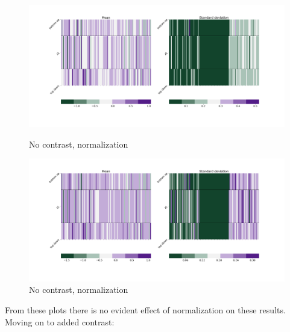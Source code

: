 \documentclass[12pt, english]{article}
\begin{document}
\begin{figure}[H]
  \begin{minipage}{0.5\linewidth}
    \centering
    \includegraphics[width=.75\linewidth]{z1_vis/z1_vis_no_contrast_norm/17_DenseLinLinLadderVAE_contrastNorm-stats-1_vector_comparisons_1.png} 
    \caption{No contrast, normalization}
    \label{fig:sample-norm-no-contrast-1}
  \end{minipage}
  \begin{minipage}{0.5\linewidth}
    \centering
    \includegraphics[width=.75\linewidth]{z1_vis/z1_vis_no_contrast_norm/17_DenseLinLinLadderVAE_contrastNorm-stats-2_vector_comparisons_1.png}
    \caption{No contrast, normalization}
    \label{fig:sample-norm-no-contrast-2}
  \end{minipage}
\end{figure}

\vspace{4mm}

\par From these plots there is no evident effect of normalization on these results. Moving on to added contrast:

\vspace{4mm}
\end{document}
